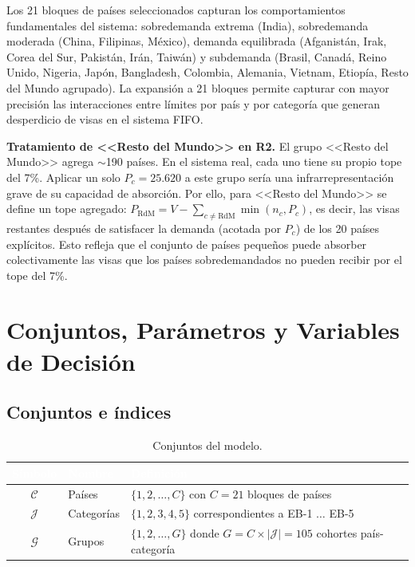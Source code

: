 \documentclass[12pt,letterpaper]{article}
\begin{document}
Los 21 bloques de países seleccionados capturan los comportamientos fundamentales del sistema: sobredemanda extrema (India), sobredemanda moderada (China, Filipinas, México), demanda equilibrada (Afganistán, Irak, Corea del Sur, Pakistán, Irán, Taiwán) y subdemanda (Brasil, Canadá, Reino Unido, Nigeria, Japón, Bangladesh, Colombia, Alemania, Vietnam, Etiopía, Resto del Mundo agrupado). La expansión a 21 bloques permite capturar con mayor precisión las interacciones entre límites por país y por categoría que generan desperdicio de visas en el sistema FIFO.

\begin{yellowbox}
\textbf{Tratamiento de <<Resto del Mundo>> en R2.} El grupo <<Resto del Mundo>> agrega $\sim$190 países. En el sistema real, cada uno tiene su propio tope del 7\%. Aplicar un solo $P_c = 25.620$ a este grupo sería una infrarrepresentación grave de su capacidad de absorción. Por ello, para <<Resto del Mundo>> se define un tope agregado: $P_{\text{RdM}} = V - \sum_{c \neq \text{RdM}} \min(n_c, P_c)$, es decir, las visas restantes después de satisfacer la demanda (acotada por $P_c$) de los 20 países explícitos. Esto refleja que el conjunto de países pequeños puede absorber colectivamente las visas que los países sobredemandados no pueden recibir por el tope del 7\%.
\end{yellowbox}

\newpage
\section{Conjuntos, Parámetros y Variables de Decisión}

\subsection{Conjuntos e índices}

\begin{table}[H]
\centering
\caption{Conjuntos del modelo.}
\label{tab:conjuntos}
\renewcommand{\arraystretch}{1.4}
\begin{tabular}{clp{7.5cm}}
\toprule
\rowcolor{tablehead}
\textcolor{white}{\textbf{Símbolo}} & \textcolor{white}{\textbf{Nombre}} & \textcolor{white}{\textbf{Definición}} \\
\midrule
$\mathcal{C}$ & Países & $\{1, 2, \ldots, C\}$ con $C = 21$ bloques de países \\
\rowcolor{gray!8}
$\mathcal{J}$ & Categorías & $\{1, 2, 3, 4, 5\}$ correspondientes a EB-1 $\ldots$ EB-5 \\
$\mathcal{G}$ & Grupos & $\{1, 2, \ldots, G\}$ donde $G = C \times |\mathcal{J}| = 105$ cohortes país-categoría \\
\bottomrule
\end{tabular}
\end{table}
\end{document}

